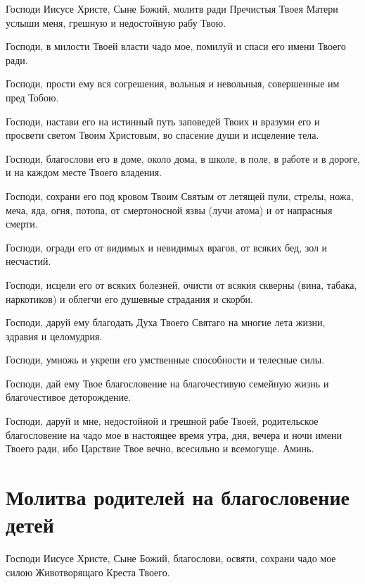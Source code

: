 Господи Иисусе Христе, Сыне Божий, молитв ради Пречистыя Твоея Матери услыши меня, грешную и недостойную рабу Твою.

Господи, в милости Твоей власти чадо мое, помилуй и спаси его имени Твоего ради.

Господи, прости ему вся согрешения, вольныя и невольныя, совершенные им пред Тобою.

Господи, настави его на истинный путь заповедей Твоих и вразуми его и просвети светом Твоим Христовым, во спасение души и исцеление тела.

Господи, благослови его в доме, около дома, в школе, в поле, в работе и в дороге, и на каждом месте Твоего владения.

Господи, сохрани его под кровом Твоим Святым от летящей пули, стрелы, ножа, меча, яда, огня, потопа, от смертоносной язвы (лучи атома) и от напрасныя смерти.

Господи, огради его от видимых и невидимых врагов, от всяких бед, зол и несчастий.

Господи, исцели его от всяких болезней, очисти от всякия скверны (вина, табака, наркотиков) и облегчи его душевные страдания и скорби.

Господи, даруй ему благодать Духа Твоего Святаго на многие лета жизни, здравия и целомудрия.

Господи, умножь и укрепи его умственные способности и телесные силы.

Господи, дай ему Твое благословение на благочестивую семейную жизнь и благочестивое деторождение.

Господи, даруй и мне, недостойной и грешной рабе Твоей, родительское благословение на чадо мое в настоящее время утра, дня, вечера и ночи имени Твоего ради, ибо Царствие Твое вечно, всесильно и всемогуще. Аминь.


{\newpage\noparindent\begin{minipage}{\textwidth}
\section{Молитва родителей на благословение детей}

\restoreparindent
Господи Иисусе Христе, Сыне Божий, благослови, освяти, сохрани чадо мое силою Животворящаго Креста Твоего.

\vspace{10\baselineskip}

\end{minipage}}


